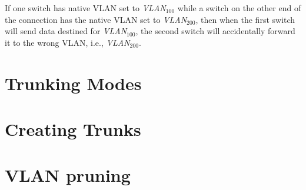 If one switch has native VLAN set to \textit{VLAN$_{100}$} while a switch on the other end of the connection has the native VLAN set to \textit{VLAN$_{200}$},  then when the first switch will send data destined for \textit{VLAN$_{100}$}, the second switch will accidentally forward it to the wrong VLAN, i.e., \textit{VLAN$_{200}$}. 

\section{Trunking Modes}


\section{Creating Trunks}


\section{VLAN pruning}


